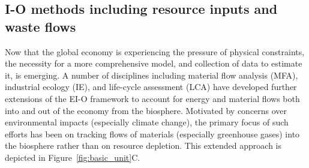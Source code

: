 %

\subsection{I-O methods including resource inputs and waste flows}
\label{sec:IO_waste}
Now that the global economy is experiencing the pressure of physical constraints, 
the necessity for a more comprehensive model, 
and collection of data to estimate it,
is emerging. 
A number of disciplines including
material flow analysis (MFA), 
industrial ecology (IE), and 
life-cycle assessment (LCA) 
have developed further extensions of the EI-O
framework to account for energy and material flows
both into and out of the economy from the biosphere.
Motivated by concerns over environmental impacts
(especially climate change),
the primary focus of such efforts has been on
tracking flows of materials
(especially greenhouse gases)
into the biosphere
rather than on resource depletion.\cite{ConAccount1998,
Lenzen1998, Hoekstra2003, Bailey2004, Pedersen2006, Turner2007}
This extended approach is depicted in Figure~\ref{fig:basic_unit}C. 

